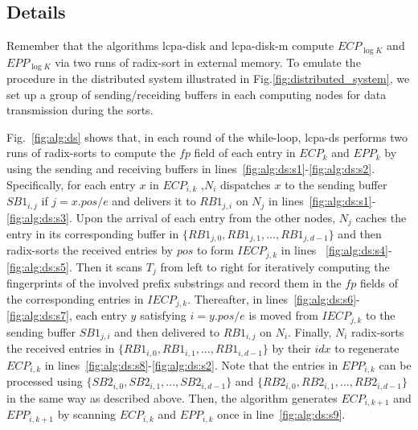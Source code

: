 \documentclass[10pt,journal,compsoc]{IEEEtran}
\begin{document}
\begin{CJK*}{GBK}{song}
\subsection{Details}

Remember that the algorithms lcpa-disk and lcpa-disk-m compute $ECP_{\log K}$ and $EPP_{\log K}$ via two runs of radix-sort in external memory. To emulate the procedure in the distributed system illustrated in Fig.\ref{fig:distributed_system}, we set up a group of sending/receiding buffers in each computing nodes for data transmission during the sorts.

Fig.~\ref{fig:alg:ds} shows that, in each round of the while-loop, lcpa-ds  performs two runs of radix-sorts to compute the $fp$ field of each entry in $ECP_k$ and $EPP_k$ by using the sending and receiving buffers in lines~\ref{fig:alg:ds:s1}-\ref{fig:alg:ds:s2}. Specifically, for each entry $x$ in $ECP_{i,k}$ ,$N_i$ dispatches $x$ to the sending buffer $SB1_{i,j}$ if $j = x.pos / e$ and delivers it to $RB1_{j,i}$ on $N_j$ in lines~\ref{fig:alg:ds:s1}-\ref{fig:alg:ds:s3}. Upon the arrival of each entry from the other nodes, $N_j$ caches the entry in its corresponding buffer in $\{RB1_{j,0},RB1_{j,1},...,RB1_{j,d-1}\}$ and then radix-sorts the received entries by $pos$ to form $IECP_{j,k}$ in lines ~\ref{fig:alg:ds:s4}-\ref{fig:alg:ds:s5}. Then it scans $T_j$ from left to right for iteratively computing the fingerprints of the involved prefix substrings and record them in the $fp$ fields of the corresponding entries in $IECP_{j,k}$. Thereafter, in lines~\ref{fig:alg:ds:s6}-\ref{fig:alg:ds:s7}, each entry $y$ satisfying $i = y.pos /e$ is moved from $IECP_{j,k}$ to the sending buffer $SB1_{j,i}$ and then delivered to $RB1_{i,j}$ on $N_i$. Finally, $N_i$ radix-sorts the received entries in $\{RB1_{i,0},RB1_{i,1},...,RB1_{i,d-1}\}$ by their $idx$ to regenerate $ECP_{i,k}$ in lines~\ref{fig:alg:ds:s8}-\ref{fig:alg:ds:s2}. Note that the entries in $EPP_{i,k}$ can be processed using $\{SB2_{i,0}, SB2_{i,1},...,SB2_{i,d-1}\}$ and $\{RB2_{i,0}, RB2_{i,1}, ...,RB2_{i,d-1}\}$ in the same way as described above. Then, the algorithm generates $ECP_{i,k+1}$ and $EPP_{i,k+1}$ by scanning $ECP_{i,k}$ and $EPP_{i,k}$ once in line~\ref{fig:alg:ds:s9}.



\end{CJK*}
\end{document}
